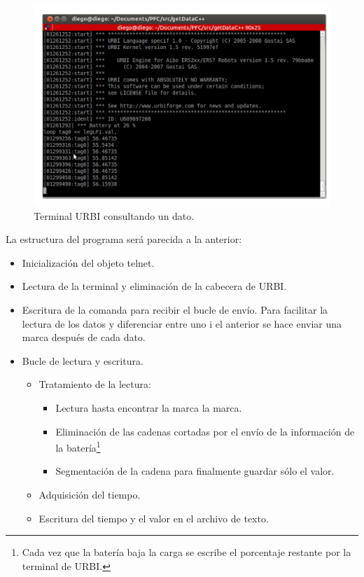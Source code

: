 \documentclass[12pt,a4paper,final,twoside]{article}
\begin{document}
\begin{figure}[h!]
	\centering
    \includegraphics[scale=0.65]{images/telnet.pdf}
	 \caption{Terminal URBI consultando un dato.}
  \label{fig:telnet}
\end{figure}

La estructura del programa será parecida a la anterior:

\begin{itemize}
\item Inicialización del objeto telnet.
\item Lectura de la terminal y eliminación de la cabecera de URBI.
\item Escritura de la comanda para recibir el bucle  de envío. Para facilitar la lectura de los datos y diferenciar entre uno i el anterior se hace enviar una marca después de cada dato.
\item Bucle de lectura y escritura.
\begin{itemize}
\item Tratamiento de la lectura:
\begin{itemize}
\item Lectura hasta encontrar la marca la marca.
\item Eliminación de las cadenas cortadas por el envío de la información de la batería\footnote{Cada vez que la batería baja la carga se escribe el porcentaje restante por la terminal de URBI.}
\item Segmentación de la cadena para finalmente guardar sólo el valor.
\end{itemize}
\item Adquisición del tiempo.
\item Escritura del tiempo y el valor en el archivo de texto.
\end{itemize} 
\end{itemize}
\end{document}
